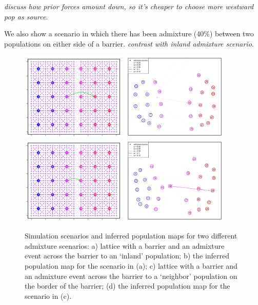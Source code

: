 \documentclass[12pt]{article}
\newcommand{\gb}[1]{{\em \color{magenta} #1}}
\begin{document}
\gb{discuss how prior forces amount down, so it's cheaper to choose more westward pop as source}.

We also show a scenario in which there has been admixture (40\%) between two populations on either side of a barrier.  \gb{contrast with inland admixture scenario}.

\begin{figure}[ht!]
	\centering
			{\includegraphics[width=2in,height=1.66in]{figs/sims/barr_indland_ad_lattice.png}}
			{\includegraphics[width=2in,height=1.66in]{figs/sims/GeoGenMap_barr_inland_admixture_1.png}}
			{\includegraphics[width=2in,height=1.66in]{figs/sims/big_barr_ad_lattice.png}}
			{\includegraphics[width=2in,height=1.66in]{figs/sims/GeoGenMap_big_barr_ad_1.png}}
	\caption{Simulation scenarios and inferred population maps for two different admixture scenarios: a) lattice with a barrier and an admixture event across the barrier to an `inland' population; b) the inferred population map for the scenario in (a); c) lattice with a barrier and an admixture event across the barrier to a `neighbor' population on the border of the barrier; (d) the inferred population map for the scenario in (c).}\label{sfig:barr_inland_ad}
\end{figure}
\end{document}
